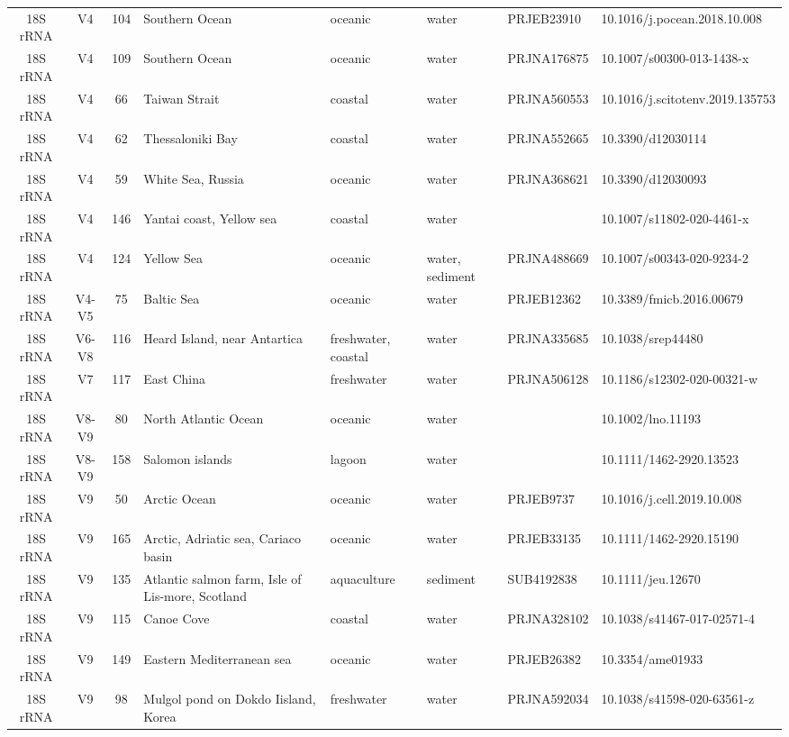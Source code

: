 \begin{longtable}{ccclllll}
  18S rRNA & V4 & 104 & Southern Ocean & oceanic & water & PRJEB23910 & 10.1016/j.pocean.2018.10.008 \\ 
  18S rRNA & V4 & 109 & Southern Ocean & oceanic & water & PRJNA176875 & 10.1007/s00300-013-1438-x \\ 
  18S rRNA & V4 & 66 & Taiwan Strait & coastal & water & PRJNA560553 & 10.1016/j.scitotenv.2019.135753 \\ 
  18S rRNA & V4 & 62 & Thessaloniki Bay & coastal & water & PRJNA552665 & 10.3390/d12030114 \\ 
  18S rRNA & V4 & 59 & White Sea, Russia & oceanic & water & PRJNA368621 & 10.3390/d12030093 \\ 
  18S rRNA & V4 & 146 & Yantai coast, Yellow sea & coastal & water &  & 10.1007/s11802-020-4461-x \\ 
  18S rRNA & V4 & 124 & Yellow Sea & oceanic & water, sediment & PRJNA488669 & 10.1007/s00343-020-9234-2 \\ 
  18S rRNA & V4-V5 & 75 & Baltic Sea & oceanic & water & PRJEB12362 & 10.3389/fmicb.2016.00679 \\ 
  18S rRNA & V6-V8 & 116 & Heard Island, near Antartica  & freshwater, coastal & water & PRJNA335685 & 10.1038/srep44480 \\ 
  18S rRNA & V7 & 117 & East China & freshwater & water & PRJNA506128 & 10.1186/s12302-020-00321-w \\ 
  18S rRNA & V8-V9 & 80 & North Atlantic Ocean & oceanic & water &  & 10.1002/lno.11193 \\ 
  18S rRNA & V8-V9 & 158 & Salomon islands & lagoon & water &  & 10.1111/1462-2920.13523 \\ 
  18S rRNA & V9 & 50 & Arctic Ocean & oceanic & water & PRJEB9737 & 10.1016/j.cell.2019.10.008 \\ 
  18S rRNA & V9 & 165 & Arctic, Adriatic sea, Cariaco basin & oceanic & water & PRJEB33135 & 10.1111/1462-2920.15190 \\ 
  18S rRNA & V9 & 135 & Atlantic salmon farm, Isle of Lis-more, Scotland & aquaculture & sediment & SUB4192838 & 10.1111/jeu.12670 \\ 
  18S rRNA & V9 & 115 & Canoe Cove & coastal & water & PRJNA328102 & 10.1038/s41467-017-02571-4 \\ 
  18S rRNA & V9 & 149 & Eastern Mediterranean sea & oceanic & water & PRJEB26382 & 10.3354/ame01933 \\ 
  18S rRNA & V9 & 98 & Mulgol pond on Dokdo Iisland, Korea & freshwater & water & PRJNA592034 & 10.1038/s41598-020-63561-z \\ 

\end{longtable}

